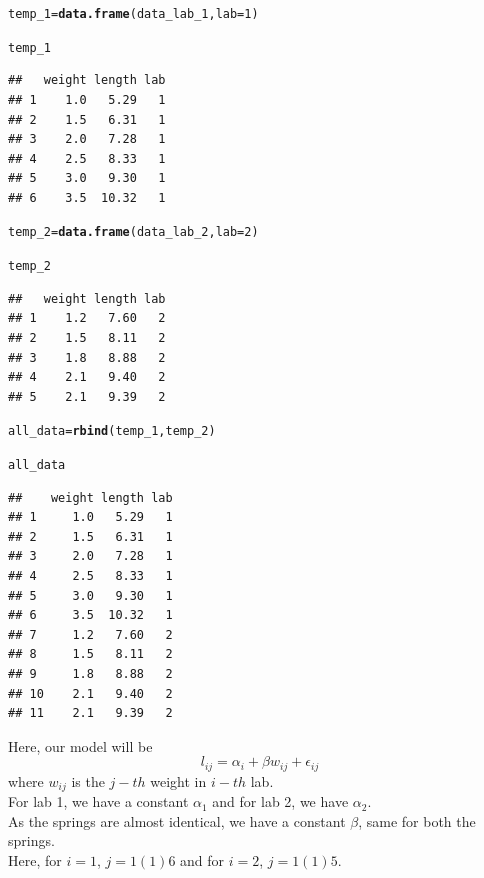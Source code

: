 \documentclass[11pt, a4paper]{article}\usepackage[]{graphicx}\usepackage[]{xcolor}
\makeatletter
\newcommand{\hlnum}[1]{\textcolor[rgb]{0.686,0.059,0.569}{#1}}%
\newcommand{\hlstd}[1]{\textcolor[rgb]{0.345,0.345,0.345}{#1}}%
\newcommand{\hlkwb}[1]{\textcolor[rgb]{0.69,0.353,0.396}{#1}}%
\newcommand{\hlkwc}[1]{\textcolor[rgb]{0.333,0.667,0.333}{#1}}%
\newcommand{\hlkwd}[1]{\textcolor[rgb]{0.737,0.353,0.396}{\textbf{#1}}}%
\newenvironment{kframe}{%
 \def\at@end@of@kframe{}%
 \ifinner\ifhmode%
  \def\at@end@of@kframe{\end{minipage}}%
  \begin{minipage}{\columnwidth}%
 \fi\fi%
 \def\FrameCommand##1{\hskip\@totalleftmargin \hskip-\fboxsep
 \colorbox{shadecolor}{##1}\hskip-\fboxsep
     \hskip-\linewidth \hskip-\@totalleftmargin \hskip\columnwidth}%
 \MakeFramed {\advance\hsize-\width
   \@totalleftmargin\z@ \linewidth\hsize
   \@setminipage}}%
 {\par\unskip\endMakeFramed%
 \at@end@of@kframe}
\newenvironment{knitrout}{}{} %
\makeatother
\begin{document}
\begin{knitrout}
\color{fgcolor}\begin{kframe}
\begin{alltt}
\hlstd{temp_1} \hlkwb{=} \hlkwd{data.frame}\hlstd{(data_lab_1,} \hlkwc{lab} \hlstd{=} \hlnum{1}\hlstd{)}

\hlstd{temp_1}
\end{alltt}
\begin{verbatim}
##   weight length lab
## 1    1.0   5.29   1
## 2    1.5   6.31   1
## 3    2.0   7.28   1
## 4    2.5   8.33   1
## 5    3.0   9.30   1
## 6    3.5  10.32   1
\end{verbatim}
\begin{alltt}
\hlstd{temp_2} \hlkwb{=} \hlkwd{data.frame}\hlstd{(data_lab_2,} \hlkwc{lab} \hlstd{=} \hlnum{2}\hlstd{)}

\hlstd{temp_2}
\end{alltt}
\begin{verbatim}
##   weight length lab
## 1    1.2   7.60   2
## 2    1.5   8.11   2
## 3    1.8   8.88   2
## 4    2.1   9.40   2
## 5    2.1   9.39   2
\end{verbatim}
\begin{alltt}
\hlstd{all_data} \hlkwb{=} \hlkwd{rbind}\hlstd{(temp_1, temp_2)}

\hlstd{all_data}
\end{alltt}
\begin{verbatim}
##    weight length lab
## 1     1.0   5.29   1
## 2     1.5   6.31   1
## 3     2.0   7.28   1
## 4     2.5   8.33   1
## 5     3.0   9.30   1
## 6     3.5  10.32   1
## 7     1.2   7.60   2
## 8     1.5   8.11   2
## 9     1.8   8.88   2
## 10    2.1   9.40   2
## 11    2.1   9.39   2
\end{verbatim}
\end{kframe}
\end{knitrout}

Here, our model will be $$ l_{ij} = \alpha_i + \beta w_{ij} + \epsilon_{ij} $$
where $w_{ij}$ is the $j-th$ weight in $i-th$ lab. \\

For lab 1, we have a constant $\alpha_1$ and for lab 2, we have $\alpha_2$. \\

As the springs are almost identical, we have a constant $\beta$, same for both the springs. \\

Here, for $i=1$, $j=1(1)6$ and for $i=2$, $j=1(1)5$. \\
\end{document}

